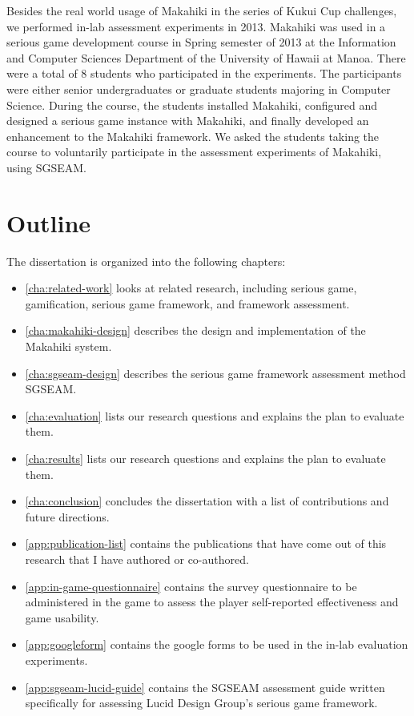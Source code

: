 Besides the real world usage of Makahiki in the series of Kukui Cup challenges, we
performed in-lab assessment experiments in 2013. Makahiki was used in a serious game
development course in Spring semester of 2013 at the Information and Computer Sciences
Department of the University of Hawaii at Manoa. There were a total of 8 students who
participated in the experiments.  The participants were either senior undergraduates or
graduate students majoring in Computer Science. During the course, the students installed
Makahiki, configured and designed a serious game instance with Makahiki, and finally
developed an enhancement to the Makahiki framework. We asked the students taking the
course to voluntarily participate in the assessment experiments of Makahiki, using SGSEAM.

\section{Outline}

The dissertation is organized into the following chapters:

\begin{itemize}
	\item \autoref{cha:related-work} looks at related research, including serious game, gamification, serious game framework, and framework assessment.
	\item \autoref{cha:makahiki-design} describes the design and implementation of the Makahiki system.
    \item \autoref{cha:sgseam-design} describes the serious game framework assessment method SGSEAM.
	\item \autoref{cha:evaluation} lists our research questions and explains the plan to evaluate them.
	\item \autoref{cha:results} lists our research questions and explains the plan to evaluate them.
	\item \autoref{cha:conclusion} concludes the dissertation with a list of contributions and future directions.
	\item \autoref{app:publication-list} contains the publications that have come out of this research that I have authored or co-authored.
	\item \autoref{app:in-game-questionnaire} contains the survey questionnaire to be administered in the game to assess the player self-reported effectiveness and game usability.
    	\item \autoref{app:googleform} contains the google forms to be used in the in-lab evaluation experiments.
	\item \autoref{app:sgseam-lucid-guide} contains the SGSEAM assessment guide written specifically for assessing Lucid Design Group's serious game framework.
\end{itemize}
